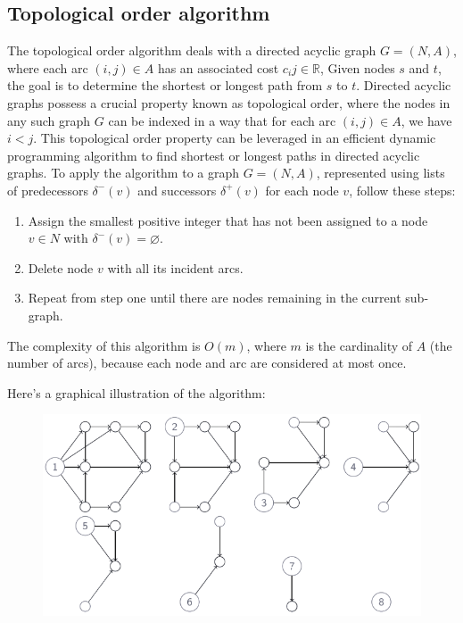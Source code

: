 \documentclass[12pt, a4paper]{report}
\begin{document}
    \subsection{Topological order algorithm}
    The topological order algorithm deals with a directed acyclic graph $G = (N,A)$, where each arc $(i,j) \in A$ has an associated cost $c_ij \in \mathbb{R}$, 
    Given nodes $s$ and $t$, the goal is to determine the shortest or longest path from $s$ to $t$.
    Directed acyclic graphs possess a crucial property known as topological order, where the nodes in any such graph $G$ can be indexed in a way that for each arc $(i, j) \in A$, we have $i < j$. 
    This topological order property can be leveraged in an efficient dynamic programming algorithm to find shortest or longest paths in directed acyclic graphs.
    To apply the algorithm to a graph $G = (N,A)$, represented using lists of predecessors $\delta^{-}(v)$ and successors $\delta^{+}(v)$ for each node $v$, follow these steps:
    \begin{enumerate}
        \item Assign the smallest positive integer that has not been assigned to a node $v \in N$ with $\delta^{-}(v)=\varnothing$. 
        \item Delete node $v$ with all its incident arcs.
        \item Repeat from step one until there are nodes remaining in the current sub-graph.
    \end{enumerate}
    The complexity of this algorithm is $O(m)$, where $m$ is the cardinality of $A$ (the number of arcs), because each node and arc are considered at most once.
    \begin{example}
        Here's a graphical illustration of the algorithm:
        \begin{figure}[H]
            \centering
            \includegraphics[width=0.8\linewidth]{images/spath.png}
        \end{figure}
    \end{example}
\end{document}
